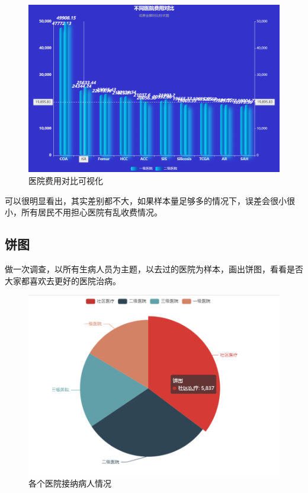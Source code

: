 \documentclass[12pt]{article}
\begin{document}
\begin{figure}[ht]
\centering
\includegraphics[scale=0.4]{figures/7.png}
\caption{医院费用对比可视化}\label{fig:label2}
\end{figure}

可以很明显看出，其实差别都不大，如果样本量足够多的情况下，误差会很小很小，所有居民不用担心医院有乱收费情况。

\subsection{饼图}
做一次调查，以所有生病人员为主题，以去过的医院为样本，画出饼图，看看是否大家都喜欢去更好的医院治病。


\begin{figure}[ht]
\centering
\includegraphics[scale=0.7]{figures/8.png}
\caption{各个医院接纳病人情况}\label{fig:label2}
\end{figure}
\end{document}
